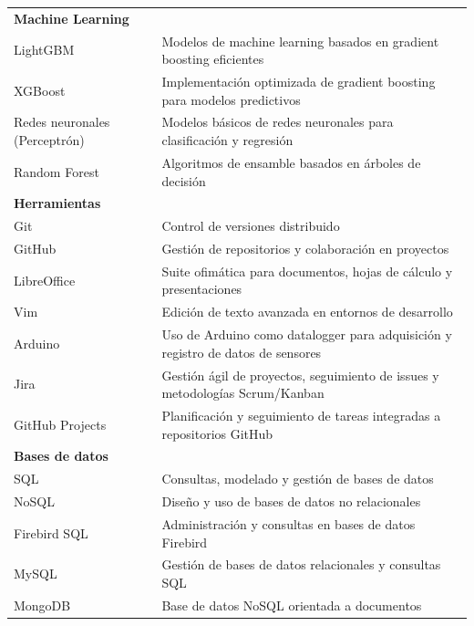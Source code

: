 \documentclass[a4paper,12pt]{article}
\begin{document}
\begin{tabularx}{\linewidth}{@{}l X@{}}
\textbf{Machine Learning} \\
LightGBM & \normalsize{Modelos de machine learning basados en gradient boosting eficientes}\\
XGBoost & \normalsize{Implementación optimizada de gradient boosting para modelos predictivos}\\
Redes neuronales (Perceptrón) & \normalsize{Modelos básicos de redes neuronales para clasificación y regresión}\\
Random Forest & \normalsize{Algoritmos de ensamble basados en árboles de decisión}\\

\textbf{Herramientas} \\
Git & \normalsize{Control de versiones distribuido}\\
GitHub & \normalsize{Gestión de repositorios y colaboración en proyectos}\\
LibreOffice & \normalsize{Suite ofimática para documentos, hojas de cálculo y presentaciones}\\
Vim & \normalsize{Edición de texto avanzada en entornos de desarrollo}\\
Arduino & \normalsize{Uso de Arduino como datalogger para adquisición y registro de datos de sensores}\\

Jira & \normalsize{Gestión ágil de proyectos, seguimiento de issues y metodologías Scrum/Kanban}\\
GitHub Projects & \normalsize{Planificación y seguimiento de tareas integradas a repositorios GitHub}\\


\textbf{Bases de datos} \\
SQL & \normalsize{Consultas, modelado y gestión de bases de datos}\\
NoSQL & \normalsize{Diseño y uso de bases de datos no relacionales}\\
Firebird SQL & \normalsize{Administración y consultas en bases de datos Firebird}\\
MySQL & \normalsize{Gestión de bases de datos relacionales y consultas SQL}\\
MongoDB & \normalsize{Base de datos NoSQL orientada a documentos}\\




\end{tabularx}




\vfill
{}
\end{document}
